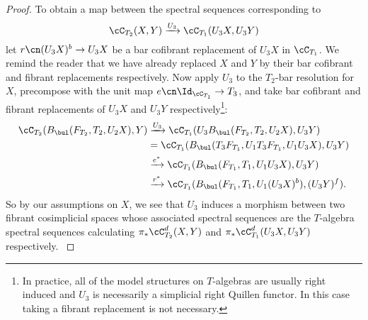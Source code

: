 \documentclass[leqno,oneside,english]{elsarticle}
\begin{document}
\begin{proof}
  To obtain a map between the spectral sequences corresponding to
  \[ 
  \cC_{T_2}(X,Y)\xrightarrow{U_3} \cC_{T_1}(U_3 X,U_3 Y)
  \]
  let $r\cn(U_3X)^b \to U_3X$ be a bar cofibrant replacement of
  $U_3X$ in $\cC_{T_1}$. We remind the reader that we have already replaced $X$ and $Y$ by their bar cofibrant and fibrant replacements respectively. Now apply $U_3$ to the $T_2$-bar resolution
  for $X$, precompose with the unit map $e\cn\Id_{\cC_{T_1}}\rightarrow
  T_3$, and take bar cofibrant and fibrant replacements of
  $U_3 X$ and $U_3 Y$ respectively\footnote{In practice, all of the
    model structures on $T$-algebras are usually right induced and
    $U_3$ is necessarily a simplicial right Quillen functor. In this case 
    taking a fibrant replacement is not necessary.}:
  \begin{align*}
     \cC_{T_2}(B_\bul (F_{T_2},T_2,U_2 X), Y)
    &\xrightarrow{U_3} \cC_{T_1}(U_{3} B_\bul (F_{T_2},T_2,U_2 X), U_3 Y)\\
    &= \cC_{T_1}( B_\bul (T_3F_{T_1},U_1T_3 F_{T_1},U_1U_3 X), U_3 Y)\\
    &\xrightarrow{e^*} \cC_{T_1}( B_\bul (F_{T_1},T_1,U_1U_3 X), U_3 Y)\\
    &\xrightarrow{r^*} \cC_{T_1}( B_\bul (F_{T_1},T_1,U_1(U_3 X)^b), (U_3 Y)^f).
  \end{align*}
  So by our assumptions on $X$, we see that $U_3$ induces a morphism between two fibrant cosimplicial spaces whose associated spectral sequences are the $T$-algebra spectral sequences calculating $\pi_*\cC_{T_2}^d(X,Y)$ and $\pi_* \cC_{T_1}^{d}(U_3 X,U_3Y)$ respectively. 
{{\ifshowsaveblocks
{}
\fi}}{}\end{proof}
\end{document}
